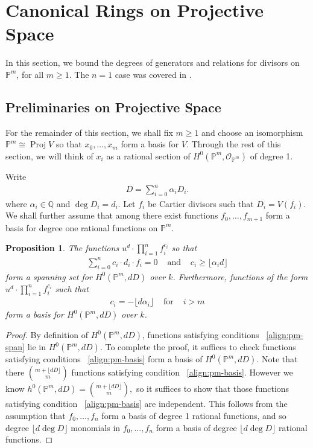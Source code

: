 \documentclass{amsart}
\theoremstyle{plain}
\newtheorem{prop}[thm]{Proposition}
\theoremstyle{definition}
\theoremstyle{remark}
\numberwithin{equation}{section}
\newcommand\ssec{\subsection}
\newcommand\bq{{\mathbb Q}}
\newcommand\bp{{\mathbb P}}
\newcommand\sco{{\mathscr O}}
\DeclareMathOperator{\proj}{Proj}
\begin{document}
\section{Canonical Rings on Projective Space}
In this section, we bound the degrees of generators and relations for divisors on $\bp^m$, for all $m \geq 1$. The $n = 1$ case was covered in \cite{dorney:canonical}.

\ssec{Preliminaries on Projective Space}

For the remainder of this section, we shall fix $m \geq 1$ and choose an isomorphism $\bp^m \cong \proj V$ so that $x_0,\ldots, x_m$ form a basis for $V$. Through the rest of this section, we will think of $x_i$ as a rational section of $H^0(\bp^m, \sco_{\bp^m})$ of degree 1.


Write
\begin{align*}
	D = \sum_{i=0}^{n}\alpha_i D_i.
\end{align*}
where $\alpha_i \in \bq$ and $\deg D_i = d_i$. Let $f_i$ be Cartier divisors such that $D_i = V(f_i)$. We shall further assume that among there exist functions $f_0,\ldots, f_{m+1}$ form a basis for degree one rational functions on $\bp^m$.

\begin{prop}
\label{prop:pm-span-and-basis}
The functions $u^d \cdot \prod_{i=1}^n f_i^{c_i}$ so that 
\begin{align}
\label{align:pm-span}
\sum_{i=0}^{n} c_i \cdot d_i \cdot f_i = 0 & \text{ and } &c_i \geq \lfloor \alpha_i d\rfloor	
\end{align}
form a spanning set for $H^0(\bp^m, dD)$ over $k$. Furthermore, functions 
of the form $u^d \cdot \prod_{i=1}^n f_i^{c_i} $ such that
\begin{align}
\label{align:pm-basis}
c_i = -\lfloor d\alpha_i \rfloor & \text{ for } & i > m
\end{align}
form a basis for $H^0(\bp^m, dD)$ over $k$.
\end{prop}
\begin{proof}
By definition of $H^0(\bp^m,dD)$, functions satisfying conditions 
~\eqref{align:pm-span} lie in $H^0(\bp^m,dD)$. To complete the proof, it suffices to check functions satisfying conditions ~\eqref{align:pm-basis} form a basis of $H^0(\bp^m,dD)$. Note that there $\binom{m+ \lfloor dD \rfloor }{m}$ functions satisfying condition ~\eqref{align:pm-basis}. However we know $h^0(\bp^m,dD) = \binom{m+ \lfloor dD \rfloor }{m},$ so it suffices to show that those functions satisfying condition ~\eqref{align:pm-basis} are independent. This follows from the assumption that $f_0,\ldots, f_n$ form a basis of degree 1 rational functions, and so degree $\lfloor d \deg D \rfloor $ monomials in $f_0,\ldots, f_n$ form a basis of degree $\lfloor d \deg D \rfloor $ rational functions.
\end{proof}
\end{document}
